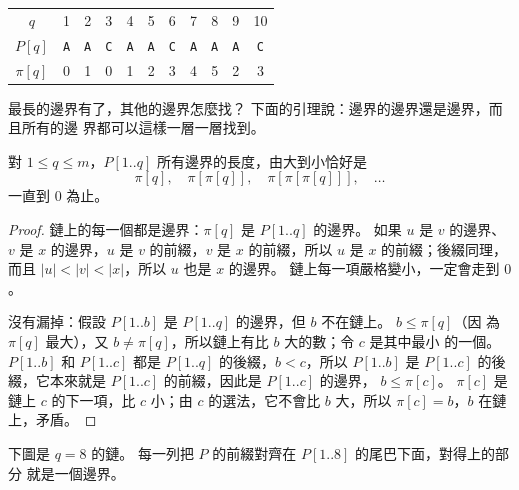 \begin{center}
\begin{tabular}{c*{10}{c}}
\toprule
$q$ & 1 & 2 & 3 & 4 & 5 & 6 & 7 & 8 & 9 & 10 \\
$P[q]$ & \texttt{A} & \texttt{A} & \texttt{C} & \texttt{A} & \texttt{A} & \texttt{C} & \texttt{A} & \texttt{A} & \texttt{A} & \texttt{C} \\
$\pi[q]$ & 0 & 1 & 0 & 1 & 2 & 3 & 4 & 5 & 2 & 3 \\
\bottomrule
\end{tabular}
\end{center}

最長的邊界有了，其他的邊界怎麼找？ 下面的引理說：邊界的邊界還是邊界，而且所有的邊
界都可以這樣一層一層找到。

\begin{lemma}[邊界的鏈]
\label{lem:stm-chain}
對 $1 \le q \le m$，$P[1..q]$ 所有邊界的長度，由大到小恰好是
\[
\pi[q], \quad \pi[\pi[q]], \quad \pi[\pi[\pi[q]]], \quad \ldots
\]
一直到 $0$ 為止。
\end{lemma}

\begin{proof}
鏈上的每一個都是邊界：$\pi[q]$ 是 $P[1..q]$ 的邊界。 如果 $u$ 是 $v$ 的邊界、$v$ 是
$x$ 的邊界，$u$ 是 $v$ 的前綴，$v$ 是 $x$ 的前綴，所以 $u$ 是 $x$ 的前綴；後綴同理，
而且 $|u| < |v| < |x|$，所以 $u$ 也是 $x$ 的邊界。 鏈上每一項嚴格變小，一定會走到
$0$。

沒有漏掉：假設 $P[1..b]$ 是 $P[1..q]$ 的邊界，但 $b$ 不在鏈上。 $b \le \pi[q]$（因
為 $\pi[q]$ 最大），又 $b \ne \pi[q]$，所以鏈上有比 $b$ 大的數；令 $c$ 是其中最小
的一個。 $P[1..b]$ 和 $P[1..c]$ 都是 $P[1..q]$ 的後綴，$b < c$，所以 $P[1..b]$ 是
$P[1..c]$ 的後綴，它本來就是 $P[1..c]$ 的前綴，因此是 $P[1..c]$ 的邊界，
$b \le \pi[c]$。 $\pi[c]$ 是鏈上 $c$ 的下一項，比 $c$ 小；由 $c$ 的選法，它不會比
$b$ 大，所以 $\pi[c] = b$，$b$ 在鏈上，矛盾。
\end{proof}

下圖是 $q = 8$ 的鏈。 每一列把 $P$ 的前綴對齊在 $P[1..8]$ 的尾巴下面，對得上的部分
就是一個邊界。

